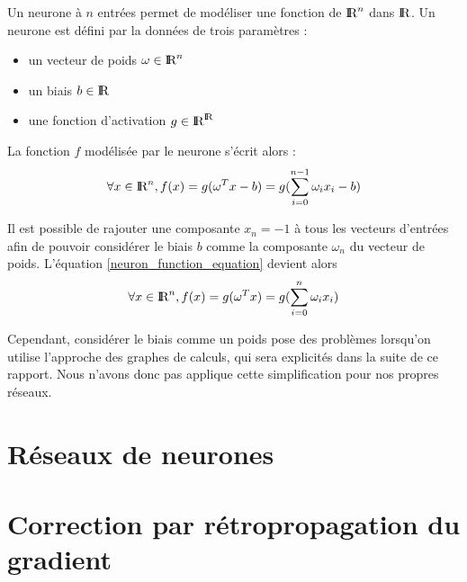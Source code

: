 \begin{definition}[Neurone] Un neurone à $n$ entrées permet de modéliser une fonction de $\textrm{I\kern-0.21emR}^n$ dans $\textrm{I\kern-0.21emR}$. Un neurone est défini par la données de trois paramètres :
  \begin{itemize}
    \item un vecteur de poids $\omega \in \textrm{I\kern-0.21emR}^n$
    \item un biais $b \in \textrm{I\kern-0.21emR}$
    \item une fonction d'activation $g \in \textrm{I\kern-0.21emR}^{\textrm{I\kern-0.21emR}}$
  \end{itemize}

La fonction $f$ modélisée par le neurone s'écrit alors : 
  \begin{equation}
\forall x \in \textrm{I\kern-0.21emR}^n, f(x) = g(\omega^{T}x - b) = g(\sum_{i=0}^{n-1}\omega_{i}x_{i} - b)
  \label{neuron_function_equation}
  \end{equation}
\end{definition}    
\begin{remark}[Biais]

Il est possible de rajouter une composante $x_{n} = -1$ à tous les vecteurs d'entrées afin de pouvoir considérer le biais $b$ comme la composante $\omega_n$ du vecteur de poids. L'équation \eqref{neuron_function_equation} devient alors
  \begin{equation}
\forall x \in \textrm{I\kern-0.21emR}^n, f(x) = g(\omega^{T}x) = g(\sum_{i=0}^{n}\omega_{i}x_{i})  
  \label{corrected_neuron_function_equation}
  \end{equation}

Cependant, considérer le biais comme un poids pose des problèmes lorsqu'on utilise l'approche des graphes de calculs, qui sera explicités dans la suite de ce rapport. Nous n'avons donc pas applique cette simplification pour nos propres réseaux.

\end{remark}



\section{Réseaux de neurones}
\section{Correction par rétropropagation du gradient}
